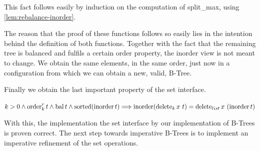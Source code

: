 This fact follows easily by induction on the computation of split\_max,
using \autoref{lem:rebalance-inorder}.

The reason that the proof of these functions follows so easily
lies in the intention behind the definition of both functions.
Together with the fact that the remaining tree is balanced and
fulfils a certain order property, the inorder view
is not meant to change.
We obtain the same elements, in the same order,
just now in a configuration from which we can obtain
a new, valid, B-Tree.

Finally we obtain the last important property of the set interface.
\begin{theorem}
    $k > 0 \wedge \operatorname{order}^r_k t \wedge \operatorname{bal} t \wedge \operatorname{sorted}  (\operatorname{inorder} t)\Longrightarrow
    \operatorname{inorder} (\operatorname{delete}_k x\ t) = \operatorname{delete}_{list} x\ (\operatorname{inorder} t)$
\end{theorem}

With this, the implementation the set interface by
our implementation of B-Trees is proven correct.
The next step towards imperative B-Trees is to implement
an imperative refinement of the set operations.
